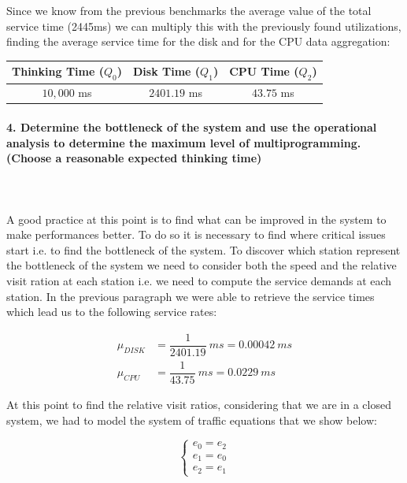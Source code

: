 \documentclass[11pt]{scrartcl} %
\begin{document}
Since we know from the previous benchmarks the average value of the total service time (2445ms) we can multiply this with the previously found utilizations, finding the average service time for the disk and for the CPU data aggregation:

\begin{table}[H]
\centering
\begin{tabular}{c|c|c}
\multicolumn{1}{l|}{Thinking Time ($Q_0$)} & \multicolumn{1}{l|}{Disk Time ($Q_1$)} & \multicolumn{1}{l}{CPU Time ($Q_2$)} \\ \hline
$10,000$ ms	&  $2401.19$ ms	& $43.75$ ms \\
\end{tabular}
\end{table}


\paragraph*{4. Determine the bottleneck of the system and use the operational analysis to determine the maximum level of multiprogramming. (Choose a reasonable expected thinking time)} \mbox{}\\\\

A good practice at this point is to find what can be improved in the system to make performances better. To do so it is necessary to find where critical issues start i.e. to find the bottleneck of the system. To discover which station represent the bottleneck of the system we need to consider both the speed and the relative  visit ration at each station i.e. we need to compute the service demands at each station. In the previous paragraph we were able to retrieve the service times which lead us  to the following service rates:

\begin{align*}
\mu_{DISK} &= \dfrac{1}{2401.19}\ ms=0.00042\ ms\\
\mu_{CPU} &= \dfrac{1}{43.75}\ ms=0.0229\ ms
\end{align*}

At this point to find the relative visit ratios, considering that we are in a closed system, we had to model the system of traffic equations that we show below:

$$\begin{cases} e_0=e_2\\ e_1=e_0\\ e_2=e_1\end{cases}$$
\end{document}

